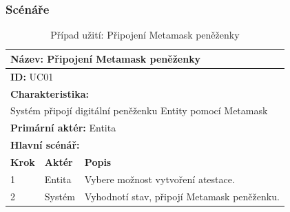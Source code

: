 \clearpage
\subsubsection{Scénáře}


\vspace{-1mm} %
\renewcommand{\arraystretch}{1.5} %
\begin{table}[h]
	\centering
	\begin{tabular}{|p{1cm}|p{2cm}|p{10cm}|}
		\hline
		\multicolumn{3}{|l|}{\textbf{Název:} Připojení Metamask peněženky} \\ \hline
		\multicolumn{3}{|l|}{\textbf{ID:} UC01} \\ \hline
		\multicolumn{3}{|l|}{\textbf{Charakteristika:}} \\ \hline
		\multicolumn{3}{|l|}{Systém připojí digitální peněženku Entity pomocí Metamask} \\ \hline
		\multicolumn{3}{|l|}{\textbf{Primární aktér:} Entita} \\ \hline
		\multicolumn{3}{|l|}{\textbf{Hlavní scénář:}} \\ \hline
		\textbf{Krok} & \textbf{Aktér} & \textbf{Popis} \\ \hline
		1 & Entita & Vybere možnost vytvoření atestace. \\ \hline
		2 & Systém & Vyhodnotí stav, připojí Metamask peněženku. \\ \hline
	\end{tabular}
	\vspace{10pt} %
	\caption{Případ užití: Připojení Metamask peněženky}
	\label{tab:usecase-metamask-connection}
\end{table}
\renewcommand{\arraystretch}{1} %




